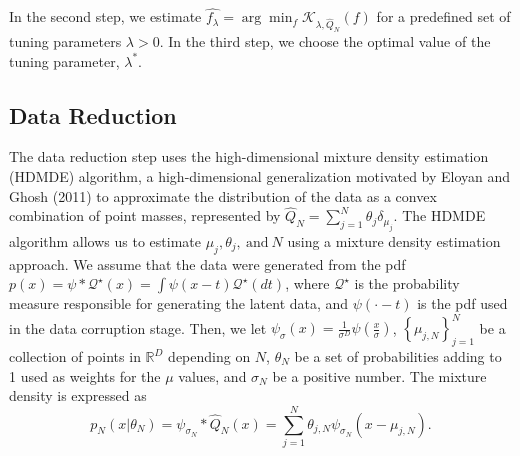 In the second step, we estimate $\hat{f_{\lambda}} = \arg \min_f \mathcal{K}_{\lambda, \hat{Q}_N}(f)$ for a predefined set of tuning parameters $\lambda > 0$. In the third step, we choose the optimal value of the tuning parameter, $\lambda^{*}$.

\subsection*{Data Reduction}

The data reduction step uses the high-dimensional mixture density estimation (HDMDE) algorithm, a high-dimensional generalization motivated by Eloyan and Ghosh (2011) to approximate the distribution of the data as a convex combination of point masses, represented by $\hat{Q}_N = \sum_{j=1}^{N}\theta_j\delta_{\mu_j}$. The HDMDE algorithm allows us to estimate $\mu_j, \theta_j, \ \text{and} \ N$ using a mixture density estimation approach. We assume that the data were generated from the pdf $p(x) = \psi * \mathcal{Q}^{\star}(x) = \int \psi(x - t)\mathcal{Q}^{\star}(dt)$, where $\mathcal{Q}^{\star}$ is the probability measure responsible for generating the latent data, and $\psi(\cdot - t)$ is the pdf used in the data corruption stage. Then, we let $\psi_{\sigma}(x) = \frac{1}{\sigma^{D}}\psi\left(\frac{x}{\sigma}\right)$, $\left\{\mu_{j, N}\right\}_{j=1}^{N}$ be a collection of points in $\mathbb{R}^{D}$ depending on $N$, $\theta_N$ be a set of probabilities adding to 1 used as weights for the $\mu$ values, and $\sigma_N$ be a positive number. The mixture density is expressed as
\[%
  p_N(x | \theta_N) = \psi_{\sigma_N} * \hat{Q}_N(x) = \sum_{j=1}^{N}\theta_{j, N}\psi_{\sigma_N}(x - \mu_{j, N})
.\]%

